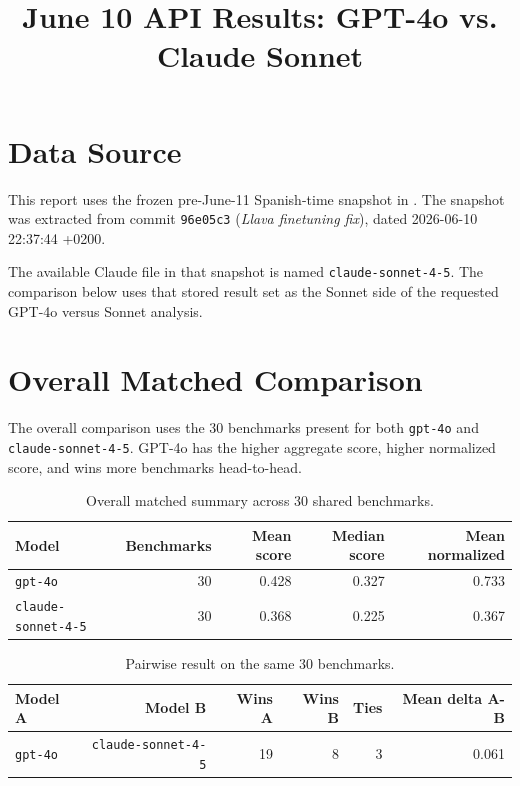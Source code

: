 \documentclass[11pt,a4paper]{article}
\title{\textbf{June 10 API Results: GPT-4o vs. Claude Sonnet}}
\author{}
\date{}
\newcommand{\code}[1]{\texttt{#1}}
\begin{document}
\maketitle

\section{Data Source}

This report uses the frozen pre-June-11 Spanish-time snapshot in
. The snapshot was extracted
from commit \code{96e05c3}
(\emph{Llava finetuning fix}), dated 2026-06-10 22:37:44 +0200.

The available Claude file in that snapshot is named
\code{claude-sonnet-4-5}. The comparison below uses that stored result set as
the Sonnet side of the requested GPT-4o versus Sonnet analysis.

\section{Overall Matched Comparison}

The overall comparison uses the 30 benchmarks present for both
\code{gpt-4o} and \code{claude-sonnet-4-5}. GPT-4o has the higher aggregate
score, higher normalized score, and wins more benchmarks head-to-head.

\begin{table}[H]
\centering
\small
\caption{Overall matched summary across 30 shared benchmarks.}
\begin{tabularx}{\textwidth}{@{}lrrrr@{}}
\toprule
\textbf{Model} & \textbf{Benchmarks} & \textbf{Mean score} & \textbf{Median score} & \textbf{Mean normalized} \\
\midrule
\code{gpt-4o} & 30 & 0.428 & 0.327 & 0.733 \\
\code{claude-sonnet-4-5} & 30 & 0.368 & 0.225 & 0.367 \\
\bottomrule
\end{tabularx}
\end{table}

\begin{table}[H]
\centering
\small
\caption{Pairwise result on the same 30 benchmarks.}
\begin{tabularx}{\textwidth}{@{}lrrrrr@{}}
\toprule
\textbf{Model A} & \textbf{Model B} & \textbf{Wins A} & \textbf{Wins B} & \textbf{Ties} & \textbf{Mean delta A-B} \\
\midrule
\code{gpt-4o} & \code{claude-sonnet-4-5} & 19 & 8 & 3 & 0.061 \\
\bottomrule
\end{tabularx}
\end{table}
\end{document}
